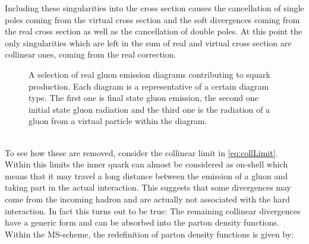 Including these singularities into the cross section causes the cancellation of single poles coming from the virtual cross section and the soft divergences coming from the real cross section as well as the cancellation of double poles. At this point the only singularities which are left in the sum of real and virtual cross section are collinear ones, coming from the real correction.
\begin{figure}[!htbp]
\begin{center}
\caption{A selection of real gluon emission diagrams contributing to squark production. Each diagram is a representative of a certain diagram type. The first one is final state gluon emission, the second one initial state gluon radiation and the third one is the radiation of a gluon from a virtual particle within the diagram.}\label{fig:RealGluon}
\end{center}
\end{figure}\\
To see how these are removed, consider the collinear limit in \eqref{eq:collLimit}. Within this limits the inner quark can almost be considered as on-shell which means that it may travel a long distance between the emission of a gluon and taking part in the actual interaction. This suggests that some divergences may come from the incoming hadron and are actually not associated with the hard interaction. In fact this turns out to be true: The remaining collinear divergences have a generic form and can be absorbed into the parton density functions. Within the $\overline{\mathrm{MS}}$-scheme, the redefinition of parton density functions is given by\cite{Harris:2001sx}:

